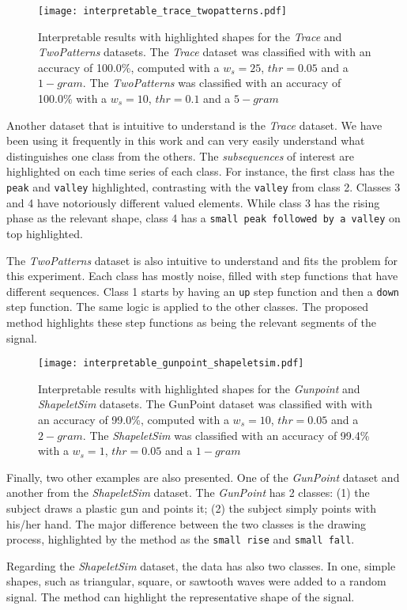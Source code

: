 \begin{figure}[h]
    \centering
    \texttt{[image: interpretable\_trace\_twopatterns.pdf]}
    \caption{Interpretable results with highlighted shapes for the \textit{Trace} and \textit{TwoPatterns} datasets. The \textit{Trace} dataset was classified with with an accuracy of 100.0\%, computed with a $w_s=25$, $thr=0.05$ and a $1-gram$. The \textit{TwoPatterns} was classified with an accuracy of 100.0\% with a $w_s=10$, $thr=0.1$ and a $5-gram$}
    \label{fig:interpretable2}
\end{figure}

Another dataset that is intuitive to understand is the \textit{Trace} dataset. We have been using it frequently in this work and can very easily understand what distinguishes one class from the others. The \textit{subsequences} of interest are highlighted on each time series of each class. For instance, the first class has the \texttt{peak} and \texttt{valley} highlighted, contrasting with the \texttt{valley} from class 2. Classes 3 and 4 have notoriously different valued elements. While class 3 has the rising phase as the relevant shape, class 4 has a \texttt{small peak followed by a valley} on top highlighted.
\par
The \textit{TwoPatterns} dataset is also intuitive to understand and fits the problem for this experiment. Each class has mostly noise, filled with step functions that have different sequences. Class 1 starts by having an \texttt{up} step function and then a \texttt{down} step function. The same logic is applied to the other classes. The proposed method highlights these step functions as being the relevant segments of the signal.

\begin{figure}[h]
    \centering
    \texttt{[image: interpretable\_gunpoint\_shapeletsim.pdf]}
    \caption{Interpretable results with highlighted shapes for the \textit{Gunpoint} and \textit{ShapeletSim} datasets. The GunPoint dataset was classified with with an accuracy of 99.0\%, computed with a $w_s=10$, $thr=0.05$ and a $2-gram$. The \textit{ShapeletSim} was classified with an accuracy of 99.4\% with a $w_s=1$, $thr=0.05$ and a $1-gram$}
    \label{fig:interpretable3}
\end{figure}

Finally, two other examples are also presented. One of the \textit{GunPoint} dataset and another from the \textit{ShapeletSim} dataset. The \textit{GunPoint} has 2 classes: (1) the subject draws a plastic gun and points it; (2) the subject simply points with his/her hand. The major difference between the two classes is the drawing process, highlighted by the method as the \texttt{small rise} and \texttt{small fall}.
\par
Regarding the \textit{ShapeletSim} dataset, the data has also two classes. In one, simple shapes, such as triangular, square, or sawtooth waves were added to a random signal. The method can highlight the representative shape of the signal. 

